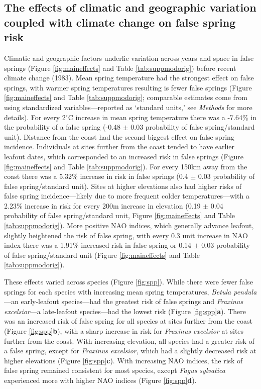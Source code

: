 \documentclass{article}\usepackage[]{graphicx}\usepackage[]{color}
\begin{document}

\subsection*{The effects of climatic and geographic variation coupled with climate change on false spring risk}
Climatic and geographic factors underlie variation across years and space in false springs (Figure \ref{fig:maineffects} and Table \ref{tab:suppmodorig}) before recent climate change (1983). Mean spring temperature had the strongest effect on false springs, with warmer spring temperatures resulting is fewer false springs (Figure \ref{fig:maineffects} and Table \ref{tab:suppmodorig}; comparable estimates come from using standardized variables---reported as `standard units,' see \textit{Methods} for more details). For every 2$^{\circ}$C increase in mean spring temperature there was a -7.64\% in the probability of a false spring (-0.48 $\pm$ 0.03 probability of false spring/standard unit). Distance from the coast had the second biggest effect on false spring incidence. Individuals at sites further from the coast tended to have earlier leafout dates, which corresponded to an increased risk in false springs (Figure \ref{fig:maineffects} and Table \ref{tab:suppmodorig}). For every 150km away from the coast there was a 5.32\% increase in risk in false springs (0.4 $\pm$ 0.03 probability of false spring/standard unit). Sites at higher elevations also had higher risks of false spring incidence---likely due to more frequent colder temperatures---with a 2.23\% increase in risk for every 200m increase in elevation (0.19 $\pm$ 0.04 probability of false spring/standard unit, Figure \ref{fig:maineffects} and Table \ref{tab:suppmodorig}). More positive NAO indices, which generally advance leafout, slightly heightened the risk of false spring, with every 0.3 unit increase in NAO index there was a 1.91\% increased risk in false spring or 0.14 $\pm$ 0.03 probability of false spring/standard unit (Figure \ref{fig:maineffects} and Table \ref{tab:suppmodorig}).  

These effects varied across species (Figure \ref{fig:spp}). While there were fewer false springs for each species with increasing mean spring temperatures,  \textit{Betula pendula}---an early-leafout species---had the greatest risk of false springs and \textit{Fraxinus excelsior}---a late-leafout species---had the lowest risk (Figure \ref{fig:spp}\textbf{a}). There was an increased risk of false spring for all species at sites further from the coast (Figure \ref{fig:spp}\textbf{b}), with a sharp increase in risk for \textit{Fraxinus excelsior} at sites further from the coast. With increasing elevation, all species had a greater risk of a false spring, except for \textit{Fraxinus excelsior}, which had a slightly decreased risk at higher elevations (Figure \ref{fig:spp}\textbf{c}).  With increasing NAO indices, the risk of false spring remained consistent for most species, except \textit{Fagus sylvatica} experienced more with higher NAO indices (Figure \ref{fig:spp}\textbf{d}). 
\end{document}
